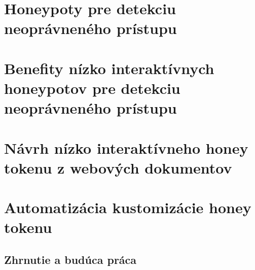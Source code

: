 \documentclass[conference, 11pt,slovak,a4paper,twoside]{IEEEtran}
\begin{document}
\section{Honeypoty pre detekciu neoprávneného prístupu}

\section{Benefity nízko interaktívnych honeypotov pre detekciu neoprávneného prístupu}

\section{Návrh nízko interaktívneho honey tokenu z webových dokumentov}

\section{Automatizácia kustomizácie honey tokenu}

\subsection{Zhrnutie a budúca práca}



\end{document}
